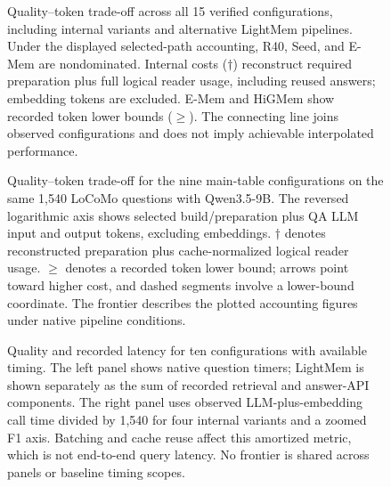\documentclass[10pt]{article}
\begin{document}
\begin{figure}[p]
\centering

\caption{Quality--token trade-off across all 15 verified configurations, including internal variants and alternative LightMem pipelines. Under the displayed selected-path accounting, R40, Seed, and E-Mem are nondominated. Internal costs ($\dagger$) reconstruct required preparation plus full logical reader usage, including reused answers; embedding tokens are excluded. E-Mem and HiGMem show recorded token lower bounds ($\geq$). The connecting line joins observed configurations and does not imply achievable interpolated performance.}
\label{fig:locomo-tokens-all}
\end{figure}
\clearpage
\begin{figure}[p]
\centering

\caption{Quality--token trade-off for the nine main-table configurations on the same 1,540 LoCoMo questions with Qwen3.5-9B. The reversed logarithmic axis shows selected build/preparation plus QA LLM input and output tokens, excluding embeddings. $\dagger$ denotes reconstructed preparation plus cache-normalized logical reader usage. $\geq$ denotes a recorded token lower bound; arrows point toward higher cost, and dashed segments involve a lower-bound coordinate. The frontier describes the plotted accounting figures under native pipeline conditions.}
\label{fig:locomo-tokens-main}
\end{figure}
\clearpage
\begin{figure}[p]
\centering

\caption{Quality and recorded latency for ten configurations with available timing. The left panel shows native question timers; LightMem is shown separately as the sum of recorded retrieval and answer-API components. The right panel uses observed LLM-plus-embedding call time divided by 1,540 for four internal variants and a zoomed F1 axis. Batching and cache reuse affect this amortized metric, which is not end-to-end query latency. No frontier is shared across panels or baseline timing scopes.}
\label{fig:locomo-latency}
\end{figure}
\clearpage
\end{document}
